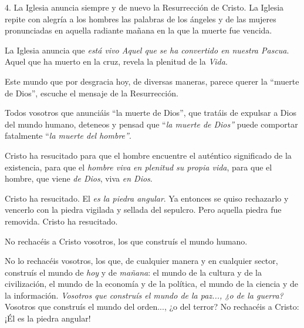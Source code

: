 			\begin{body}4. La Iglesia anuncia siempre y de nuevo la Resurrección de Cristo. La Iglesia repite con alegría a los hombres las palabras de los ángeles y de las mujeres pronunciadas en aquella radiante mañana en la que la muerte fue vencida.\end{body}
			
			\begin{body}La Iglesia anuncia que \textit{está vivo Aquel que se ha convertido en nuestra Pascua}. Aquel que ha muerto en la cruz, revela la plenitud de la \textit{Vida}.\end{body}
			
			\begin{body}Este mundo que por desgracia hoy, de diversas maneras, parece querer la “muerte de Dios”, escuche el mensaje de la Resurrección.\end{body}
			
			\begin{body}Todos vosotros que anunciáis “la muerte de Dios”, que tratáis de expulsar a Dios del mundo humano, deteneos y pensad que “\textit{la muerte de Dios”} puede comportar fatalmente “\textit{la muerte del hombre”}.\end{body}
			
			\begin{body}Cristo ha resucitado para que el hombre encuentre el auténtico significado de la existencia, para que el \textit{hombre viva en plenitud su propia vida}, para que el hombre, que viene \textit{de Dios}, viva \textit{en Dios}.\end{body}
			
			\begin{body}Cristo ha resucitado. El \textit{es la piedra angular}. Ya entonces se quiso rechazarlo y vencerlo con la piedra vigilada y sellada del sepulcro. Pero aquella piedra fue removida. Cristo ha resucitado.\end{body}
			
			\begin{body}No rechacéis a Cristo vosotros, los que construís el mundo humano.\end{body}
			
			\begin{body}No lo rechacéis vosotros, los que, de cualquier manera y en cualquier sector, construís el mundo de \textit{hoy} y de \textit{mañana}: el mundo de la cultura y de la civilización, el mundo de la economía y de la política, el mundo de la ciencia y de la información. \textit{Vosotros que construís el mundo de la paz..., ¿o de la guerra?} Vosotros que construís el mundo del orden..., ¿o del terror? No rechacéis a Cristo: ¡Él es la piedra angular!\end{body}
			
